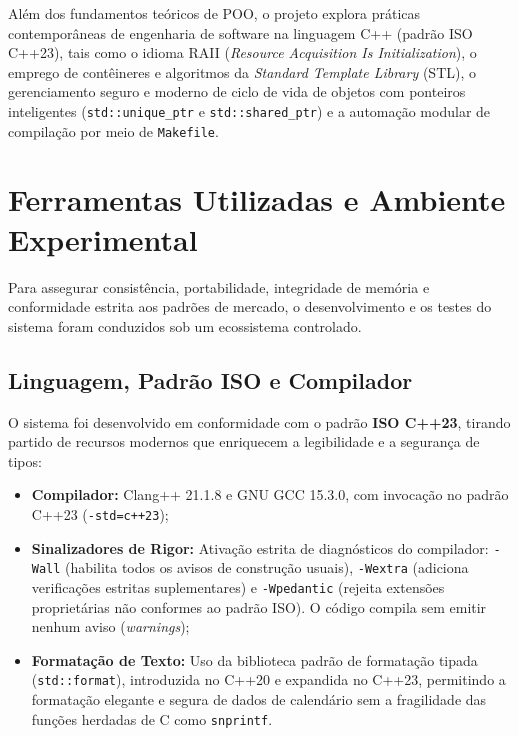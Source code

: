 \documentclass[12pt,a4paper]{article}
\begin{document}
Além dos fundamentos teóricos de POO, o projeto explora práticas contemporâneas de engenharia de software na linguagem C++ (padrão ISO C++23), tais como o idioma RAII (\textit{Resource Acquisition Is Initialization}), o emprego de contêineres e algoritmos da \textit{Standard Template Library} (STL), o gerenciamento seguro e moderno de ciclo de vida de objetos com ponteiros inteligentes (\texttt{std::unique\_ptr} e \texttt{std::shared\_ptr}) e a automação modular de compilação por meio de \texttt{Makefile}.

\section{Ferramentas Utilizadas e Ambiente Experimental}
\label{sec:ferramentas}

Para assegurar consistência, portabilidade, integridade de memória e conformidade estrita aos padrões de mercado, o desenvolvimento e os testes do sistema foram conduzidos sob um ecossistema controlado.

\subsection{Linguagem, Padrão ISO e Compilador}
O sistema foi desenvolvido em conformidade com o padrão \textbf{ISO C++23}, tirando partido de recursos modernos que enriquecem a legibilidade e a segurança de tipos:
\begin{itemize}
    \item \textbf{Compilador:} Clang++ 21.1.8 e GNU GCC 15.3.0, com invocação no padrão C++23 (\texttt{-std=c++23});
    \item \textbf{Sinalizadores de Rigor:} Ativação estrita de diagnósticos do compilador: \texttt{-Wall} (habilita todos os avisos de construção usuais), \texttt{-Wextra} (adiciona verificações estritas suplementares) e \texttt{-Wpedantic} (rejeita extensões proprietárias não conformes ao padrão ISO). O código compila sem emitir nenhum aviso (\textit{warnings});
    \item \textbf{Formatação de Texto:} Uso da biblioteca padrão de formatação tipada (\texttt{std::format}), introduzida no C++20 e expandida no C++23, permitindo a formatação elegante e segura de dados de calendário sem a fragilidade das funções herdadas de C como \texttt{snprintf}.
\end{itemize}
\end{document}
